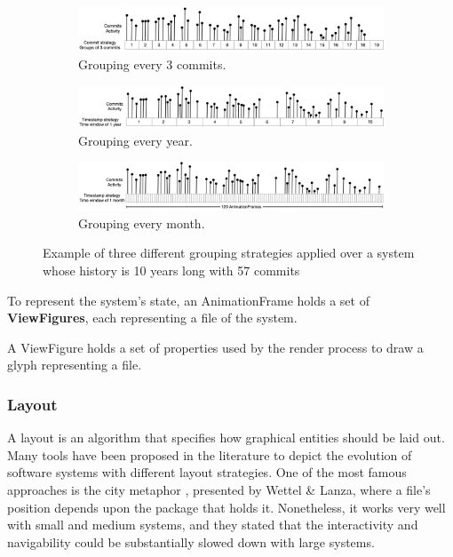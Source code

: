 \begin{figure}
    \begin{center}
        \begin{subfigure}{1\textwidth}
            \includegraphics[width=\linewidth]{TimeWindow1.jpg}
            \caption{Grouping every 3 commits.} 
            \label{fig:TimeWindow1}
        \end{subfigure}
        \begin{subfigure}{1\textwidth}
            \includegraphics[width=\linewidth]{TimeWindow2.jpg}
            \caption{Grouping every year.} 
            \label{fig:TimeWindow2}
        \end{subfigure}
        \begin{subfigure}{1\textwidth}
            \includegraphics[width=\linewidth]{TimeWindow3.jpg}
            \caption{Grouping every month.}
            \label{fig:TimeWindow3}
        \end{subfigure}
        \caption[Example of three different grouping strategies]{Example of three different grouping strategies applied over a system whose history is 10 years long with 57 commits}
        \label{fig:TimeWindowExamples}
    \end{center}
\end{figure}



To represent the system's state, an AnimationFrame holds a set of \textbf{ViewFigures}, each representing a file of the system.

A ViewFigure holds a set of properties used by the render process to draw a glyph representing a file. 

\subsubsection*{Layout}
A layout is an algorithm that specifies how graphical entities should be laid out. 
Many tools have been proposed in the literature to depict the evolution of software systems with different layout strategies. 
One of the most famous approaches is the city metaphor \cite{Wettel2007}, presented by Wettel \& Lanza, where a file's position depends upon the package that holds it. 
Nonetheless, it works very well with small and medium systems, and they stated that the interactivity and navigability could be substantially slowed down with large systems.

